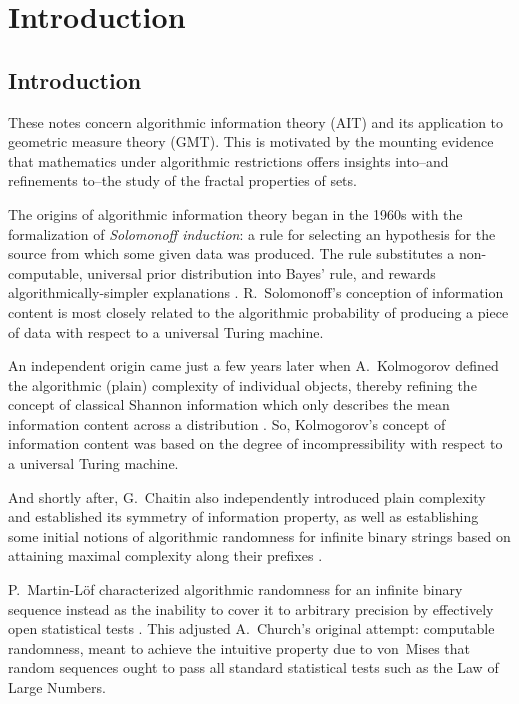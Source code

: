 \chapter{Introduction} \label{introduction:introduction}

\section{Introduction} \label{section:Introduction}

These notes concern algorithmic information theory (AIT) and its application to geometric measure theory (GMT). This is motivated by the mounting evidence that mathematics under algorithmic restrictions offers insights into--and refinements to--the study of the fractal properties of sets. 

The origins of algorithmic information theory began in the 1960s with the formalization of \textit{Solomonoff induction}: a rule for selecting an hypothesis for the source from which some given data was produced. The rule substitutes a non-computable, universal prior distribution into Bayes' rule, and rewards algorithmically-simpler explanations \cite{Sol60}. R.~Solomonoff's conception of information content is most closely related to the algorithmic probability of producing a piece of data with respect to a universal Turing machine. 

An independent origin came just a few years later when A.~Kolmogorov defined the algorithmic (plain) complexity of individual objects, thereby refining the concept of classical Shannon information which only describes the mean information content across a distribution \cite{Kol68, Kol68b}. So, Kolmogorov's concept of information content was based on the degree of incompressibility with respect to a universal Turing machine. 

And shortly after, G.~Chaitin also independently introduced plain complexity and established its symmetry of information property, as well as establishing some initial notions of algorithmic randomness for infinite binary strings based on attaining maximal complexity along their prefixes \cite{Cha66}. 

P.~Martin-L{\"o}f characterized algorithmic randomness for an infinite binary sequence instead as the inability to cover it to arbitrary precision by effectively open statistical tests \cite{Mar66}. This adjusted A.~Church's original attempt: computable randomness, meant to achieve the intuitive property due to von~Mises that random sequences ought to pass all standard statistical tests such as the Law of Large Numbers. 

